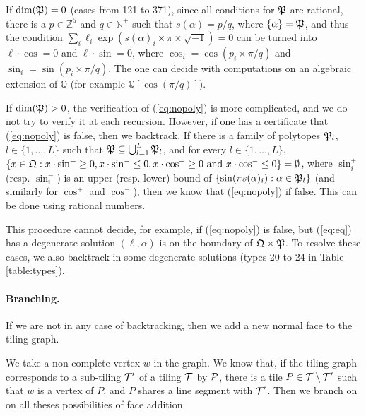 \documentclass[11pt]{article}
\theoremstyle{definition}
\begin{document}
If $\dim(\mathfrak{P})=0$ (cases from 121 to 371), since all conditions for $\mathfrak{P}$ are rational, there is a $p\in\mathbb{Z}^5$ and $q\in \mathbb{N}^+$ such that $s(\alpha)={p}/{q}$, where $\{\alpha\}=\mathfrak{P}$, and thus the condition $\sum_i \ell_i \exp(s(\alpha)_i \times \pi \times \sqrt{-1})= 0$ can be turned into $\ell \cdot \cos =0$ and $\ell \cdot \sin =0$, where $\cos_i=\cos(p_i \times {\pi}/{q})$ and $\sin_i=\sin(p_i \times {\pi}/{q})$.
The one can decide with computations on an algebraic extension of $\mathbb{Q}$ (for example $\mathbb{Q}[\cos\left({\pi}/{q}\right)]$).
%
%

%

\medskip

If $\dim(\mathfrak{P})>0$, the verification of (\ref{eq:nopoly}) is more complicated, and we do not try to verify it at each recursion.
However, if one has a certificate that (\ref{eq:nopoly}) is false, then we backtrack.
If there is a family of polytopes
$\mathfrak{P}_l$, $l\in \{1,\ldots,L\}$
such that $\mathfrak{P}\subseteq \bigcup_{l=1}^L \mathfrak{P}_l$, and for every $l\in \{1,\ldots,L\}$, $\{x\in \mathfrak{Q} : x\cdot \sin^+ \ge 0, x\cdot \sin^- \le 0,x\cdot \cos^+ \ge 0 \text{ and } x\cdot \cos^- \le 0\} = \emptyset$, where $\sin^+_i$ (resp. $\sin^-_i$) is an upper (resp. lower) bound of $\{\sin(\pi s(\alpha)_i) : \alpha \in \mathfrak{P}_l\}$ (and similarly for $\cos^+$ and $\cos^-$), then we know that (\ref{eq:nopoly}) if false. This can be done using rational numbers.
%


%

%
%
%
%
%
%

This procedure cannot decide, for example, if (\ref{eq:nopoly}) is false, but (\ref{eq:eq}) has a degenerate solution $(\ell,\alpha)$ is on the boundary of $\mathfrak{Q} \times \mathfrak{P}$.
To resolve these cases, we also backtrack in some degenerate solutions (types 20 to 24 in Table \ref{table:types}).

\paragraph{Branching.}
If we are not in any case of backtracking, then we add a new normal face to the tiling graph. 

We take a non-complete vertex $w$ in the graph. We know that, if the tiling graph corresponds to a sub-tiling $\mathcal{T}'$ of a tiling $\mathcal{T}$ by $\mathcal{P}$, there is a tile $P\in \mathcal{T} \setminus \mathcal{T}'$ such that $w$ is a vertex of $P$, and $P$ shares a line segment with $\mathcal{T}'$.
%
%
Then we branch on on all theses possibilities of face addition.
\end{document}

